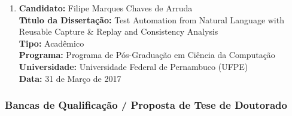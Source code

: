 \documentclass[a4paper,oneside,10pt]{article}
\begin{document}
\begin{enumerate}
\item       \textbf{Candidato:} Filipe Marques Chaves de Arruda \mbox{} \\
            \textbf{T\'{\i}tulo da Disserta\c{c}\~{a}o:} Test Automation from Natural Language with Reusable Capture \& Replay and Consistency Analysis\\
            \textbf{Tipo:} Acadêmico\\
            \textbf{Programa:} Programa de Pós-Graduação em Ciência da Computação\\
            \textbf{Universidade:} Universidade Federal de Pernambuco (UFPE)\\
            \textbf{Data:} 31 de Março de 2017
\end{enumerate}


\subsubsection{Bancas de Qualifica\c{c}\~ao / Proposta de Tese de Doutorado}
\vspace{0.3cm}
\end{document}
